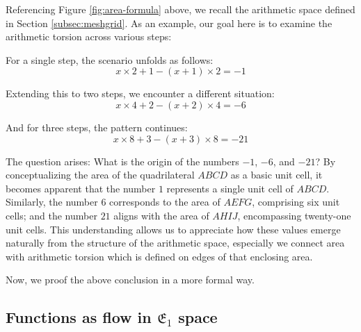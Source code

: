 Referencing Figure \ref{fig:area-formula} above, we recall the arithmetic space defined in Section \ref{subsec:meshgrid}.
As an example, our goal here is to examine the arithmetic torsion across various steps:

For a single step, the scenario unfolds as follows:
\begin{equation}
    x \times 2 + 1 - (x + 1) \times 2 = -1
\end{equation}

Extending this to two steps, we encounter a different situation:
\begin{equation}
    x \times 4 + 2 - (x + 2) \times 4 = -6
\end{equation}

And for three steps, the pattern continues:
\begin{equation}
    x \times 8 + 3 - (x + 3) \times 8 = -21
\end{equation}

The question arises: What is the origin of the numbers $-1$, $-6$, and $-21$? By conceptualizing the area of the quadrilateral $ABCD$ as a basic unit cell,
it becomes apparent that the number $1$ represents a single unit cell of $ABCD$.
Similarly, the number $6$ corresponds to the area of $AEFG$, comprising six unit cells;
and the number $21$ aligns with the area of $AHIJ$, encompassing twenty-one unit cells.
This understanding allows us to appreciate how these values emerge naturally from the structure of the arithmetic space,
especially we connect area with arithmetic torsion which is defined on edges of that enclosing area.

Now, we proof the above conclusion in a more formal way.

\subsection{Functions as flow in $\mathfrak{E}_1$ space}

\newpage
